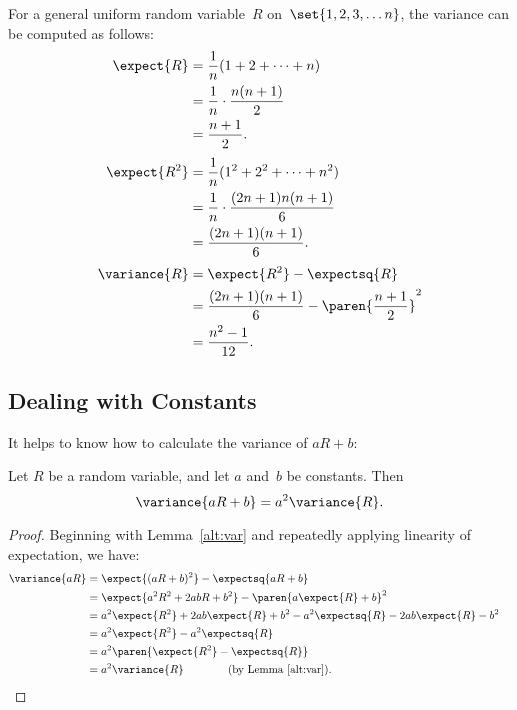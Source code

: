 For a general uniform random variable~$R$ on~$\set{1, 2, 3, \dots n}$,
the variance can be computed as follows:
\begingroup
\openup\jot
\begin{align*}
\expect{R}
    &= \frac{1}{n} (1 + 2 + \dots + n) \\
    &= \frac{1}{n} \cdot \frac{n (n + 1)}{2} \\
    &= \frac{n + 1}{2}. \\[\jot]
%
\expect{R^2}
    &= \frac{1}{n} (1^2 + 2^2 + \dots + n^2) \\
    &= \frac{1}{n} \cdot \frac{(2n + 1) n (n + 1)}{6} \\
    &= \frac{(2n + 1) (n + 1)}{6}. \\[\jot]
%
\variance{R}
    &= \expect{R^2} - \expectsq{R} \\
    &= \frac{(2n + 1) (n + 1)}{6} - \paren{\frac{n + 1}{2}}^2 \\
    &= \frac{n^2 - 1}{12}.
\end{align*}
\endgroup

\subsection{Dealing with Constants}

It helps to know how to calculate the variance of $a R + b$:

\begin{theorem}\label{var.const}\label{var+const}\label{thm:var(aR+b)}
Let $R$ be a random variable, and let $a$ and~$b$ be constants. Then
\begin{equation}\label{a2R}
    \variance{a R + b} = a^2 \variance{R}.
\end{equation}
\end{theorem}

\begin{proof}
Beginning with Lemma~\ref{alt:var} and repeatedly applying linearity
of expectation, we have:
\begin{align*}
\variance{aR}
    &= \expect{(a R + b)^2} - \expectsq{a R + b} \\
    &= \expect{a^2 R^2 + 2 a b R + b^2}
            - \paren{a \expect{R} + b}^2 \\
    &= a^2 \expect{R^2} + 2 a b \expect{R} + b^2
        - a^2 \expectsq{R} - 2 a b \expect{R} - b^2 \\
    & = a^2\expect{R^2} -a^2\expectsq{R}\\
    & = a^2\paren{\expect{R^2} - \expectsq{R}}\\
    & = a^2\variance{R} \qquad\qquad \text{(by Lemma~\ref{alt:var})}. & \qedhere
\end{align*}
\end{proof}

